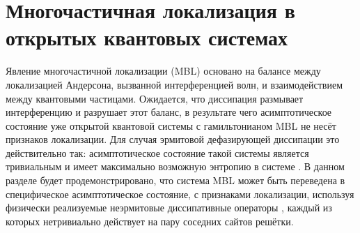 \section{Многочастичная локализация в открытых квантовых системах}\label{sec:ch1/prb_mbl}
Явление многочастичной локализации (MBL) основано на балансе между локализацией Андерсона, вызванной интерференцией волн, и взаимодействием между квантовыми частицами. Ожидается, что диссипация размывает интерференцию и разрушает этот баланс, в результате чего асимптотическое состояние уже открытой квантовой системы с гамильтонианом MBL не несёт признаков локализации. Для случая эрмитовой дефазирующей диссипации это действительно так: асимптотическое состояние такой системы является тривиальным и имеет максимально возможную энтропию в системе \cite{Levi2016, Fischer2016, Medvedyeva2016}. В данном разделе будет продемонстрировано, что система MBL может быть переведена в специфическое асимптотическое состояние, с признаками локализации, используя физически реализуемые неэрмитовые диссипативные операторы \cite{Diehl2008}, каждый из которых нетривиально действует на пару соседних сайтов решётки.

